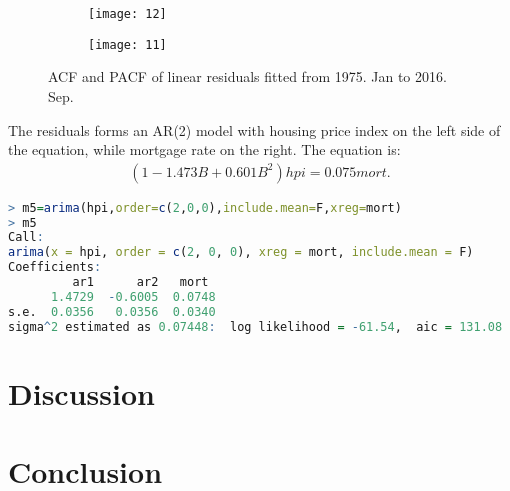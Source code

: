 \documentclass[12pt,letterpaper]{article}
\begin{document}
\begin{figure*}[h!]
\begin{subfigure}[b]{0.4\textwidth}
\begin{center}
 \texttt{[image: 12]}
 \vspace{-0.4cm}
\end{center}
\end{subfigure}
\qquad
\qquad
\begin{subfigure}[b]{0.4\textwidth}
\begin{center}
 \texttt{[image: 11]}
 \vspace{-0.4cm}
\end{center}
\end{subfigure}
 \vspace{-.1cm}
 \caption{ ACF and PACF of linear residuals fitted from 1975. Jan to 2016. Sep.}
      \label{fig:time}
\vspace{-.25cm}
\end{figure*}

The residuals forms an AR(2) model with housing price index on the left side of the equation, while mortgage rate on the right.
The equation is: 
\begin{equation}
\begin{aligned}
(1-1.473B+0.601B^2) hpi = 0.075mort.
\end{aligned}
\end{equation}

{\footnotesize
\begin{lstlisting}[language=R]
> m5=arima(hpi,order=c(2,0,0),include.mean=F,xreg=mort)
> m5
Call:
arima(x = hpi, order = c(2, 0, 0), xreg = mort, include.mean = F)
Coefficients:
         ar1      ar2   mort
      1.4729  -0.6005  0.0748
s.e.  0.0356   0.0356  0.0340
sigma^2 estimated as 0.07448:  log likelihood = -61.54,  aic = 131.08
\end{lstlisting}
}


\section{Discussion}

\section{Conclusion}
\end{document}
